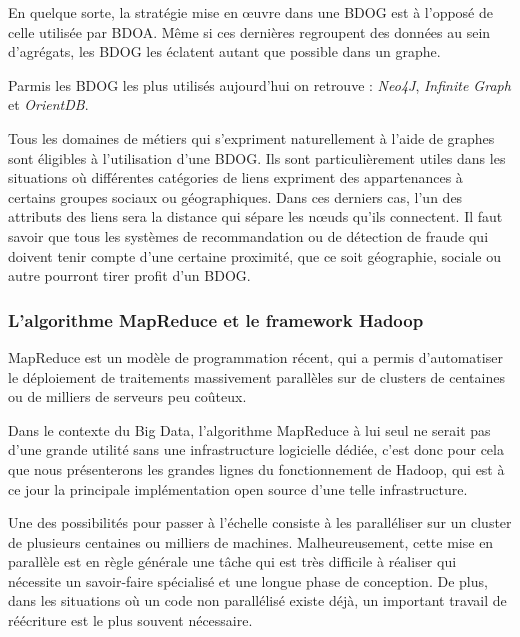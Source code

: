 \documentclass[12pt]{article}
\begin{document}
En quelque sorte, la stratégie mise en œuvre dans une BDOG est à l'opposé de celle utilisée par BDOA. Même si ces dernières regroupent des données au sein d'agrégats, les BDOG les éclatent autant que possible dans un graphe. \par
Parmis les BDOG les plus utilisés aujourd'hui on retrouve : \emph{Neo4J}, \emph{Infinite Graph} et \emph{OrientDB}.
\par
Tous les domaines de métiers qui s'expriment naturellement à l'aide de graphes sont éligibles à l'utilisation d'une BDOG. Ils sont particulièrement utiles dans les situations où différentes catégories de liens expriment des appartenances à certains groupes sociaux ou géographiques. Dans ces derniers cas, l'un des attributs des liens sera la distance qui sépare les nœuds qu'ils connectent. Il faut savoir que tous les systèmes de recommandation ou de détection de fraude qui doivent tenir compte d'une certaine proximité, que ce soit géographie, sociale ou autre pourront tirer profit d'un BDOG.
\subsubsection{L'algorithme MapReduce et le framework Hadoop}
MapReduce est un modèle de programmation récent, qui a permis d'automatiser le déploiement de traitements massivement parallèles sur de clusters de centaines ou de milliers de serveurs peu coûteux. \par
Dans le contexte du Big Data, l’algorithme MapReduce à lui seul ne serait pas d'une grande utilité sans une infrastructure logicielle dédiée, c'est donc pour cela que nous présenterons les grandes lignes du fonctionnement de Hadoop, qui est à ce jour la principale implémentation open source d'une telle infrastructure. \par
Une des possibilités pour passer à l'échelle consiste à les paralléliser sur un cluster de plusieurs centaines ou milliers de machines. Malheureusement, cette mise en parallèle est en règle générale une tâche qui est très difficile à réaliser qui nécessite un savoir-faire spécialisé et une longue phase de conception. De plus, dans les situations où un code non parallélisé existe déjà, un important travail de réécriture est le plus souvent nécessaire. \par
\end{document}
